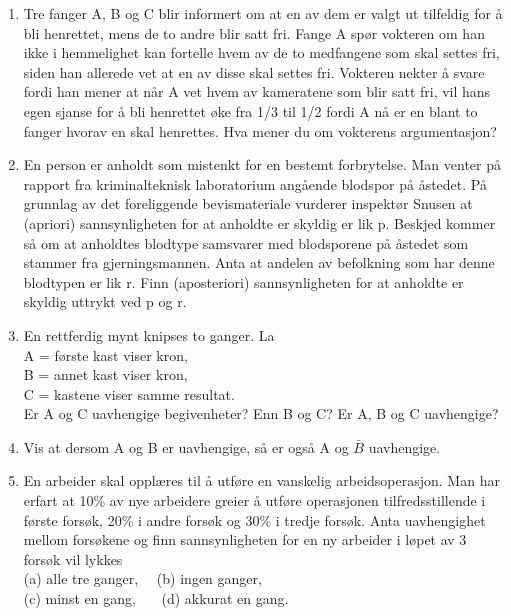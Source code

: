 \begin{enumerate}
\item  Tre fanger A, B og C blir informert om at en av dem er valgt
     ut tilfeldig for å bli henrettet, mens de to andre blir satt
     fri. Fange A spør vokteren om han ikke i hemmelighet kan
     fortelle hvem av de to medfangene som skal settes fri,
     siden han allerede vet at en av disse skal settes fri.
     Vokteren nekter å svare fordi han mener at når A vet hvem av
     kameratene som blir satt fri, vil hans egen sjanse for å bli
     henrettet øke fra 1/3 til 1/2 fordi A nå er en blant to
     fanger hvorav en skal henrettes. Hva mener du om vokterens
     argumentasjon?

\item  En person er anholdt som mistenkt for en bestemt
     forbrytelse. Man venter på rapport fra kriminalteknisk
     laboratorium angående blodspor på åstedet. På grunnlag av
     det foreliggende bevismateriale vurderer inspektør Snusen at
     (apriori) sannsynligheten for at anholdte er skyldig er lik
     p. Beskjed kommer så om at anholdtes blodtype samsvarer med
     blodsporene på åstedet som stammer fra gjerningsmannen. Anta
     at andelen av befolkning som har denne blodtypen er lik r.
     Finn (aposteriori) sannsynligheten for at anholdte er
     skyldig uttrykt ved p og r.

\item  En rettferdig mynt knipses to ganger. La \\
     \indent      A = første kast viser kron, \\
     \indent      B = annet kast viser kron, \\
     \indent      C = kastene viser samme resultat.\\
     Er A og C uavhengige begivenheter? Enn B og C? Er A, B og C
     uavhengige?

\item  Vis at dersom A og B er uavhengige, så er også A og $\bar{B}$  
     uavhengige.

\item  En arbeider skal opplæres til å utføre en vanskelig
     arbeidsoperasjon. Man har erfart at 10\% av nye arbeidere
     greier å utføre operasjonen tilfredsstillende i første
     forsøk, 20\% i andre forsøk og 30\% i tredje forsøk. Anta
     uavhengighet mellom forsøkene og finn sannsynligheten for en
     ny arbeider i løpet av 3 forsøk vil lykkes \\
     (a)  alle tre ganger,\mbox{\ \ } (b)  ingen ganger,\\
     (c)  minst en gang,\mbox{\ \ \ }  (d)  akkurat en gang.


\end{enumerate}
